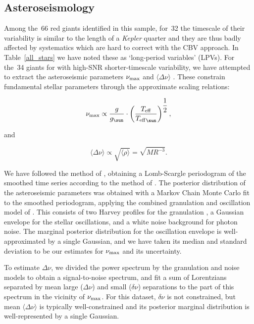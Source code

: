 \documentclass[a4paper,fleqn,usenatbib]{mnras}
\newcommand{\numax}{\mbox{$\nu_{\rm max}$}\xspace}
\newcommand{\Dnu}{\mbox{$\Delta \nu$}\xspace}
\newcommand{\dnu}{\mbox{$\delta \nu$}\xspace}
\newcommand{\teff}{\mbox{$T_{\rm eff}$}\xspace}
\newcommand{\kepler}{\textit{Kepler}\xspace}
\begin{document}



\subsection{Asteroseismology}
\label{asteroseismology}

Among the~66 red giants identified in this sample, for~32 the timescale of their variability is similar to the length of a \kepler quarter and they are thus badly affected by systematics which are hard to correct with the CBV approach. In Table~\ref{all_stars} we have noted these as `long-period variables' (LPVs). For the~34 giants for with high-SNR shorter-timescale variability, we have attempted to extract the asteroseismic parameters \numax and $\langle \Dnu \rangle$ \citep{KB95,2013ARA&A..51..353C}. These constrain fundamental stellar parameters through the approximate scaling relations: 

\begin{equation}
\label{scaling}
\numax \propto \dfrac{g}{g_{\sun}} \cdot \left(\dfrac{\teff}{\teff_{\sun}}\right)^{\dfrac{1}{2}},
\end{equation}

and

\begin{equation}
\label{Dnuscaling}
\langle \Dnu \rangle \propto \sqrt{\langle \rho \rangle} = \sqrt{M {R}^{-3}}.
\end{equation}

We have followed the method of \citet{2016AN....337..774D}, obtaining a Lomb-Scargle periodogram of the smoothed time series according to the method of \citet{2011MNRAS.414L...6G}. The posterior distribution of the asteroseismic parameters was obtained with a Markov Chain Monte Carlo fit to the smoothed periodogram, applying the combined granulation and oscillation model of \citet{2014A&A...570A..41K}. This consists of two Harvey profiles for the granulation \citep{1985ESASP.235..199H}, a Gaussian envelope for the stellar oscillations, and a white noise background for photon noise. The marginal posterior distribution for the oscillation envelope is well-approximated by a single Gaussian, and we have taken its median and standard deviation to be our estimates for \numax and its uncertainty.

To estimate \Dnu, we divided the power spectrum by the granulation and noise models to obtain a signal-to-noise spectrum, and fit a sum of Lorentzians separated by mean large (\Dnu) and small (\dnu) separations to the part of this spectrum in the vicinity of \numax. For this dataset, \dnu is not constrained, but mean $\langle \Dnu \rangle$ is typically well-constrained and its posterior marginal distribution is well-represented by a single Gaussian. 
\end{document}
